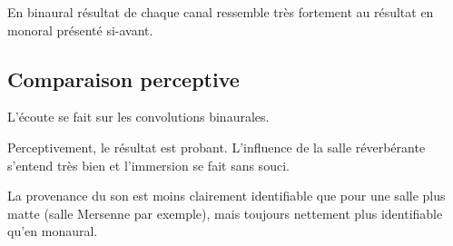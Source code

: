 En binaural résultat de chaque canal ressemble très fortement au résultat en monoral présenté si-avant.

\subsection{Comparaison perceptive} %

L'écoute se fait sur les convolutions binaurales.

Perceptivement, le résultat est probant. L'influence de la salle réverbérante s'entend très bien et l'immersion se fait
sans souci.

La provenance du son est moins clairement identifiable que pour une salle plus matte (salle Mersenne par exemple),
mais toujours nettement plus identifiable qu'en monaural.
